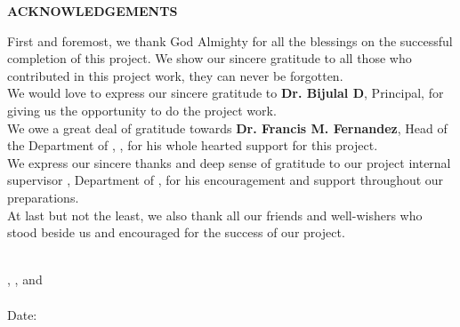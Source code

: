 \thispagestyle{plain}

\begin{center}
 \Large {\bf \uppercase{Acknowledgements}}
\end{center}

\vspace{3\baselineskip}
\justifying
%
%
%

First and foremost, we thank God Almighty for all the blessings on the successful
completion of this project. We show our sincere gratitude to all those who contributed in this
project work, they can never be forgotten.
\\
We would love to express our sincere gratitude to 
{\bf Dr. Bijulal D}, Principal,
\University for giving us the opportunity to do the project
work.
\\
 We owe a great deal of gratitude towards {\bf Dr. Francis M. Fernandez}, Head of the Department of \Department, \University, for his whole
hearted support for this project.
\\
 We express our sincere thanks and deep sense of gratitude
to our project internal supervisor {\bf \Supervisor}, Department of \Department, for his encouragement and support throughout our preparations.
\\
At last but not the least, we also thank all our friends and well-wishers who stood
beside us and encouraged for the success of our project.

\centering
\noindent
\vspace{\baselineskip} \\
\textbf{\firstAuthor}, \textbf{\secondAuthor}, \textbf{\thirdAuthor} and \textbf{\fourthAuthor}\\
\University \\
Date: \reportSubmissionDate